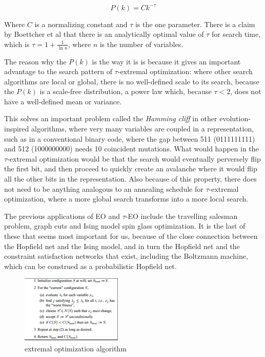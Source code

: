 \documentclass[12pt]{article}
\begin{document}
$$P(k) = Ck^{-\tau}$$

Where $C$ is a normalizing constant and $\tau$ is the one parameter. There is a claim by Boettcher et al that there is an analytically optimal value of $\tau$ for search time, which is $\tau = 1 + \frac{1}{\ln n}$, where $n$ is the number of variables.%

The reason why the $P(k)$ is the way it is is because it gives an important advantage to the search pattern of $\tau$-extremal optimization: where other search algorithms are local or global, there is no well-defined scale to its search, because the $P(k)$ is a scale-free distribution, a power law which, because $\tau < 2$, does not have a well-defined mean or variance.

This solves an important problem called the \emph{Hamming cliff} in other evolution-inspired algorithms, where very many variables are coupled in a representation, such as in a conventional binary code, where the gap between 511 (0111111111) and 512 (1000000000) needs 10 coincident mutations. What would happen in the $\tau$-extremal optimization would be that the search would eventually perversely flip the first bit, and then proceed to quickly create an avalanche where it would flip all the other bits in the representation. Also because of this property, there does not need to be anything analogous to an annealing schedule for $\tau$-extremal optimization, where a more global search transforms into a more local search.

The previous applications of EO and $\tau$-EO include the travelling salesman problem, graph cuts and Ising model spin glass optimization. It is the last of these that seems most important for us, because of the close connection between the Hopfield net and the Ising model, and in turn the Hopfield net and the constraint satisfaction networks that exist, including the Boltzmann machine, which can be construed as a probabilistic Hopfield net.

\begin{figure}
  \includegraphics{eo_alg} %
  \caption{extremal optimization algorithm}
\end{figure}
\end{document}
